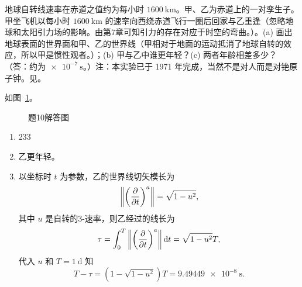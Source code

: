 \begin{xiti}
	\item 地球自转线速率在赤道之值约为每小时 $\SI{1600}{\kilo\metre}$。甲、乙为赤道上的一对孪生子。甲坐飞机以每小时 $\SI{1600}{\kilo\metre}$ 的速率向西绕赤道飞行一圈后回家与乙重逢（忽略地球和太阳引力场的影响。由第7章可知引力的存在对应于时空的弯曲。）。(a) 画出地球表面的世界面和甲、乙的世界线（甲相对于地面的运动抵消了地球自转的效应，所以甲是惯性观者。）；(b) 甲与乙中谁更年轻？(c) 两者年龄相差多少？（答：约为$\SI{e-7}{\second}$。）注：本实验已于 1971 年完成，当然不是对人而是对铯原子钟。见\cite{Hafele166}。

		\begin{jie}
			如图~\ref{pic-6.10}。
			\begin{figure}[htb!]
				\centering
				\caption{题10解答图}\label{pic-6.10}
			\end{figure}
			\begin{enumerate}[label=(\alph*)]
				\item 233
				\item 乙更年轻。
				\item 以坐标时 $t$ 为参数，乙的世界线切矢模长为
				\begin{equation*}
					\norm{\tensor{\left( \pdv{t} \right)}{^a}} = \sqrt{1-u^2},
				\end{equation*}
				其中 $u$ 是自转的3-速率，则乙经过的线长为
				\begin{equation*}
					\tau = \int_0^T \norm{\tensor{\left( \pdv{t} \right)}{^a}} \dd{t} = \sqrt{1-u^2} T,
				\end{equation*}
				代入 $u$ 和 $T=\SI{1}{\day}$ 知
				\begin{equation*}
					T-\tau=\left( 1- \sqrt{1-u^2} \right) T = \SI{9.49449e-8}{\second}.
				\end{equation*}
			\end{enumerate}
		\end{jie}


\end{xiti}
